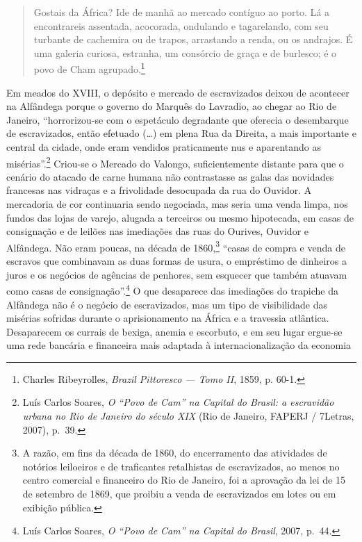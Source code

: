 \begin{quote}
Gostais da África? Ide de manhã ao mercado contíguo ao porto. Lá a
encontrareis assentada, acocorada, ondulando e tagarelando, com seu
turbante de cachemira ou de trapos, arrastando a renda, ou os andrajos.
É uma galeria curiosa, estranha, um consórcio de graça e de burlesco; é
o povo de Cham agrupado.\footnote{Charles Ribeyrolles, \textit{Brazil
  Pittoresco --- Tomo II}, 1859, p. 60-1.}
\end{quote}

Em meados do XVIII, o depósito e mercado de escravizados deixou de
acontecer na Alfândega porque o governo do Marquês do Lavradio, ao
chegar ao Rio de Janeiro, ``horrorizou-se com o espetáculo degradante
que oferecia o desembarque de escravizados, então efetuado (\ldots{}) em
plena Rua da Direita, a mais importante e central da cidade, onde eram
vendidos praticamente nus e aparentando as misérias''.\footnote{Luís
  Carlos Soares, \textit{O ``Povo de Cam'' na Capital do Brasil: a
  escravidão urbana no Rio de Janeiro do século XIX} (Rio de Janeiro,
  FAPERJ / 7Letras, 2007), p.~39.} Criou-se o Mercado do Valongo,
suficientemente distante para que o cenário do atacado de carne humana
não contrastasse as galas das novidades francesas nas vidraças e a
frivolidade desocupada da rua do Ouvidor. A mercadoria de cor
continuaria sendo negociada, mas seria uma venda limpa, nos fundos das
lojas de varejo, alugada a terceiros ou mesmo hipotecada, em casas de
consignação e de leilões nas imediações das ruas do Ourives, Ouvidor e
Alfândega. Não eram poucas, na década de 1860,\footnote{A razão, em fins
  da década de 1860, do encerramento das atividades de notórios
  leiloeiros e de traficantes retalhistas de escravizados, ao menos no
  centro comercial e financeiro do Rio de Janeiro, foi a aprovação da
  lei de 15 de setembro de 1869, que proibiu a venda de escravizados em
  lotes ou em exibição pública.} ``casas de compra e venda de escravos
que combinavam as duas formas de usura, o empréstimo de dinheiros a
juros e os negócios de agências de penhores, sem esquecer que também
atuavam como casas de consignação''.\footnote{Luís Carlos Soares,
  \textit{O ``Povo de Cam'' na Capital do Brasil}, 2007, p.~44.} O que
desaparece das imediações do trapiche da Alfândega não é o negócio de
escravizados, mas um tipo de visibilidade das misérias sofridas durante
o aprisionamento na África e a travessia atlântica. Desaparecem os
currais de bexiga, anemia e escorbuto, e em seu lugar ergue-se uma rede
bancária e financeira mais adaptada à internacionalização da economia
